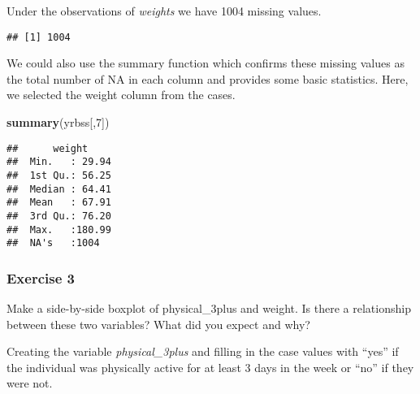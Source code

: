 \documentclass[
]{article}
\newenvironment{Shaded}{\begin{snugshade}}{\end{snugshade}}
\newcommand{\DataTypeTok}[1]{\textcolor[rgb]{0.13,0.29,0.53}{#1}}
\newcommand{\DecValTok}[1]{\textcolor[rgb]{0.00,0.00,0.81}{#1}}
\newcommand{\KeywordTok}[1]{\textcolor[rgb]{0.13,0.29,0.53}{\textbf{#1}}}
\newcommand{\NormalTok}[1]{#1}
\newcommand{\OperatorTok}[1]{\textcolor[rgb]{0.81,0.36,0.00}{\textbf{#1}}}
\newcommand{\StringTok}[1]{\textcolor[rgb]{0.31,0.60,0.02}{#1}}
\begin{document}
Under the observations of \emph{weights} we have 1004 missing values.

\begin{Shaded}
\end{Shaded}

\begin{verbatim}
## [1] 1004
\end{verbatim}

We could also use the summary function which confirms these missing
values as the total number of NA in each column and provides some basic
statistics. Here, we selected the weight column from the cases.

\begin{Shaded}
\begin{Highlighting}[]
\KeywordTok{summary}\NormalTok{(yrbss[,}\DecValTok{7}\NormalTok{])}
\end{Highlighting}
\end{Shaded}

\begin{verbatim}
##      weight      
##  Min.   : 29.94  
##  1st Qu.: 56.25  
##  Median : 64.41  
##  Mean   : 67.91  
##  3rd Qu.: 76.20  
##  Max.   :180.99  
##  NA's   :1004
\end{verbatim}

\hypertarget{exercise-3}{%
\subsubsection{Exercise 3}\label{exercise-3}}

Make a side-by-side boxplot of physical\_3plus and weight. Is there a
relationship between these two variables? What did you expect and why?

Creating the variable \emph{physical\_3plus} and filling in the case
values with ``yes'' if the individual was physically active for at least
3 days in the week or ``no'' if they were not.

\begin{Shaded}
\end{Shaded}
\end{document}
